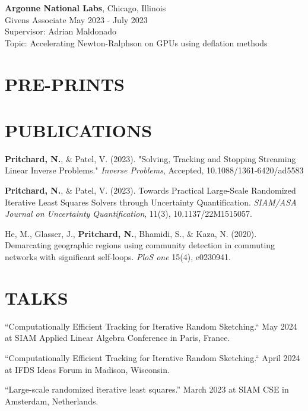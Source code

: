 \documentclass[margin,11pt]{res}
\def\nwp{\textbf{Pritchard, N.}}
\begin{document}
\begin{resume}
                {\bf Argonne National Labs}, \hfill Chicago, Illinois\\
                Givens Associate \hfill May 2023 - July 2023\\
                Supervisor: Adrian Maldonado\\
                Topic: Accelerating Newton-Ralphson on GPUs using deflation methods
\section{PRE-PRINTS}
\section{PUBLICATIONS}
\nwp, \& Patel, V. (2023). "Solving, Tracking and Stopping Streaming Linear Inverse Problems." \textit{Inverse Problems}, Accepted, 10.1088/1361-6420/ad5583


\nwp, \& Patel, V. (2023). Towards Practical Large-Scale Randomized Iterative Least Squares Solvers through Uncertainty Quantification. \textit{SIAM/ASA Journal on Uncertainty Quantification}, 11(3), 10.1137/22M1515057. 

He, M., Glasser, J., \nwp, Bhamidi, S., \& Kaza, N. (2020). Demarcating geographic regions using community detection in commuting networks with significant self-loops. \textit{PloS one} 15(4), e0230941.



\section{TALKS}

``Computationally Efficient Tracking for Iterative Random Sketching.`` May 2024 at SIAM Applied Linear Algebra Conference in Paris, France.

``Computationally Efficient Tracking for Iterative Random Sketching.`` April 2024 at IFDS Ideas Forum in Madison, Wisconsin.

``Large-scale randomized iterative least squares.'' March 2023 at SIAM CSE in Amsterdam, Netherlands.


\end{resume}
\end{document}
